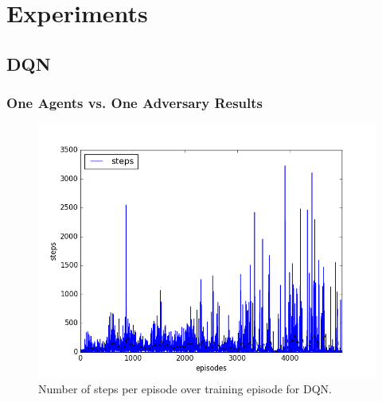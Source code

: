 
\section{Experiments}
\label{sec:experiment}


\subsection{DQN}
\label{sec:experiment:dqn}


\subsubsection{One Agents vs. One Adversary Results}
\label{sec:experiment:dqn:1vs1}


\begin{figure}[h]
  \centering
  \includegraphics[trim=10 10 10 10,clip,width=\figscale\linewidth]
  {../results/dqn_1vs1/steps.png}
  \caption{Number of steps per episode over training episode for DQN.}
  \label{fig:dqn-1vs1}
\end{figure}
\FloatBarrier


